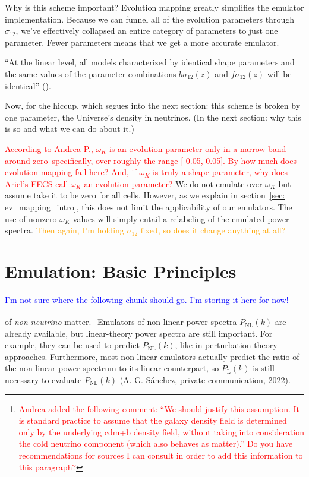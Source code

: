 Why is this scheme important? Evolution mapping greatly simplifies the emulator
implementation. Because we can
funnel all of the evolution parameters through $\sigma_{12}$, we've effectively
collapsed an entire category of parameters to just one parameter. Fewer
parameters means that we get a more accurate emulator.

``At the linear level, all models characterized by identical shape parameters
and the same values of the parameter combinations $b \sigma_{12}(z)$ and
$f \sigma_{12}(z)$ will be identical'' ().

Now, for the hiccup, which segues into the next section: this scheme is broken by one parameter, the Universe's
density in neutrinos. (In the next section: why this is so and what we can do
about it.)


\textcolor{red}{According to Andrea P., $\omega_K$ is an evolution parameter 
only in a narrow 
band around zero--specifically, over roughly the range [-0.05, 0.05].
By how much does evolution mapping fail here? And, if 
$\omega_K$ is truly a shape parameter, why does Ariel's FECS call $\omega_K$
an evolution parameter?} We do not emulate over $\omega_K$ but assume take
it to be zero for all cells. However, as we explain in
section~\ref{sec: ev_mapping_intro}, this does not limit the applicability of
our emulators. The use of nonzero $\omega_K$ values will simply entail a
relabeling of the emulated power spectra. \textcolor{orange}{Then again, I'm
holding $\sigma_{12}$ fixed, so does it change anything at all?}

\section{Emulation: Basic Principles}
\label{sec: emulation_intro}

\textcolor{blue}{I'm not sure where the following chunk should go. I'm storing
it here for now!}

 of \textit{non-neutrino} 
matter.\footnote{\textcolor{red}{Andrea added the following comment: ``We 
should 
justify this assumption. It is standard practice to assume that the galaxy 
density field is determined only by the underlying cdm+b density field, 
without taking into consideration the cold neutrino component (which also 
behaves as matter).'' Do you have recommendations for sources I can consult in
order to add this information to this paragraph?}} Emulators of non-linear 
power spectra $P_\text{NL}(k)$ are 
already available, but linear-theory power spectra are still important.
For example, they can be used to predict $P_\text{NL}(k)$, like in 
perturbation theory approaches. Furthermore, most non-linear emulators
actually predict the ratio of the non-linear power spectrum to its linear
counterpart, so $P_\text{L}(k)$ is still necessary to evaluate
$P_\text{NL}(k)$ (A. G. S\'{a}nchez, private communication, 2022).

